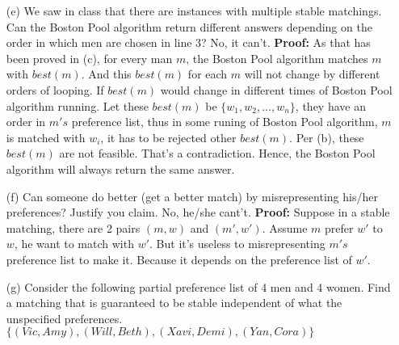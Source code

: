 \documentclass{article}       %
\begin{document}
\begin{enumerate}
\begin{enumerate}
                \item[(e)] We saw in class that there are instances with multiple stable matchings. Can the Boston Pool algorithm return different answers depending on the order in which men are chosen in line 3?\newline\newline
                No, it can't.\newline
                \textbf{Proof:} As that has been proved in (c), for every man $m$, the Boston Pool algorithm matches $m$ with $best(m)$. And this $best(m)$ for each $m$ will not change by different orders of looping.\newline
                If $best(m)$ would change in different times of Boston Pool algorithm running. Let these $best(m)$ be $\{w_1, w_2, ..., w_n\}$, they have an order in $m's$ preference list, thus in some runing of Boston Pool algorithm, $m$ is matched with $w_i$, it has to be rejected other $best(m)$. Per (b), these $best(m)$ are not feasible. That's a contradiction.\newline
                Hence, the Boston Pool algorithm will always return the same answer.\newline
                
                \item[(f)] Can someone do better (get a better match) by misrepresenting his/her preferences? Justify you claim.\newline\newline
                No, he/she cant't.\newline
                \textbf{Proof:} Suppose in a stable matching, there are 2 pairs $(m, w)$ and $(m', w')$. Assume $m$ prefer $w'$ to $w$, he want to match with $w'$. But it's useless to misrepresenting $m's$ preference list to make it. Because it depends on the preference list of $w'$.\newline
                
                \item[(g)] Consider the following partial preference list of 4 men and 4 women. Find a matching that is guaranteed to be stable independent of what the unspecified preferences.\newline\newline
                $\{(Vic, Amy), (Will, Beth), (Xavi, Demi), (Yan, Cora)\}$\newline
                

\end{enumerate}
\end{enumerate}
\end{document}
